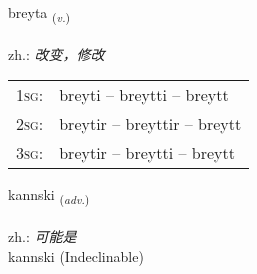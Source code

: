 \documentclass[frontgrid, backgrid]{flacards}\usepackage[]{graphicx}\usepackage[]{xcolor}
\begin{document}
\renewcommand{\blhead}{\vskip5pt {\small\bfseries\footnotesize Sagnorð | 动词 }}
\renewcommand{\bcfoot}{\vskip5pt \hspace{2pt}{\small\bfseries\footnotesize 1K}}


{breyta \small{\textsubscript{(\textit{v.})}} \\[1ex] %
\textphonetic{[preiːta]} \\
zh.: \emph{改变，修改} \\  [2ex]
\renewcommand*{\arraystretch}{0.8}
\begin{tabular}{p{1cm}l}
\textsc{1sg}: & breyti -- breytti -- breytt \\ 
\textsc{2sg}: & breytir -- breyttir -- breytt \\ 
\textsc{3sg}: & breytir -- breytti -- breytt \\ 
\end{tabular}
}


\renewcommand{\flhead}{\vskip5pt \fboxsep=0pt {\small\bfseries\footnotesize Atviksorð | 副词}}
\renewcommand{\fcfoot}{\vskip5pt \fboxsep=0pt \hspace{2pt}{\small\bfseries\footnotesize 1K}}

\renewcommand{\blhead}{\vskip5pt {\small\bfseries\footnotesize Atviksorð | 副词 }}
\renewcommand{\bcfoot}{\vskip5pt \hspace{2pt}{\small\bfseries\footnotesize 1K}}


{kannski \small{\textsubscript{(\textit{adv.})}} \\[1ex]
\textphonetic{[kʰanscɪ]} \\
zh.: \emph{可能是} \\  [2ex]
kannski (Indeclinable)}

\renewcommand{\flhead}{\vskip5pt \fboxsep=0pt {\small\bfseries\footnotesize Nafnorð | 名词}}
\renewcommand{\fcfoot}{\vskip5pt \fboxsep=0pt \hspace{2pt}{\small\bfseries\footnotesize 1K}}

\renewcommand{\blhead}{\vskip5pt {\small\bfseries\footnotesize Nafnorð | 名词 }}
\renewcommand{\bcfoot}{\vskip5pt \hspace{2pt}{\small\bfseries\footnotesize 1K}}
\end{document}
